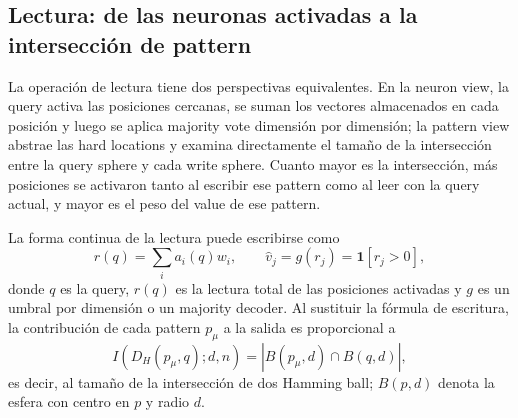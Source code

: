 
\subsection{Lectura: de las neuronas activadas a la intersección de pattern}

La operación de lectura tiene dos perspectivas equivalentes. En la neuron view, la query activa las posiciones cercanas, se suman los vectores almacenados en cada posición y luego se aplica majority vote dimensión por dimensión; la pattern view abstrae las hard locations y examina directamente el tamaño de la intersección entre la query sphere y cada write sphere. Cuanto mayor es la intersección, más posiciones se activaron tanto al escribir ese pattern como al leer con la query actual, y mayor es el peso del value de ese pattern.




La forma continua de la lectura puede escribirse como
$$
r(q)=\sum_i a_i(q)w_i,
\qquad
\hat v_j=g(r_j)=\mathbf{1}[r_j>0],
$$
donde $q$ es la query, $r(q)$ es la lectura total de las posiciones activadas y $g$ es un umbral por dimensión o un majority decoder. Al sustituir la fórmula de escritura, la contribución de cada pattern $p_\mu$ a la salida es proporcional a
$$
I\!\left(D_H(p_\mu,q);d,n\right)
=\left|B(p_\mu,d)\cap B(q,d)\right|,
$$
es decir, al tamaño de la intersección de dos Hamming ball; $B(p,d)$ denota la esfera con centro en $p$ y radio $d$.


